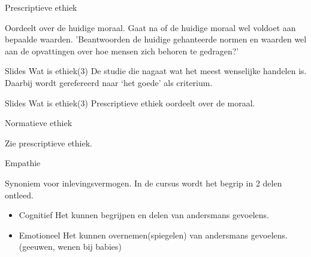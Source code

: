 \documentclass[main.tex]{subfiles}
\begin{document}
\begin{examenvraag}
    \begin{vraag}
        Prescriptieve ethiek
    \end{vraag}

    \begin{antwoord}
	    	
    	Oordeelt over de huidige moraal.
    	Gaat na of de huidige moraal wel voldoet aan bepaalde waarden. 
    	'Beantwoorden de huidige gehanteerde normen en waarden wel aan de opvattingen over hoe mensen zich behoren te gedragen?'
    		
		\begin{citaat}{Slides Wat is ethiek(3)}
				De studie die nagaat wat het meest wenselijke handelen is. 
				Daarbij wordt gerefereerd naar ‘het goede’ als criterium.
		\end{citaat}
		\begin{citaat}{Slides Wat is ethiek(3)}
				Prescriptieve ethiek oordeelt over de moraal.
		\end{citaat}
    \end{antwoord}
\end{examenvraag}


\begin{examenvraag}
    \begin{vraag}
        Normatieve ethiek
    \end{vraag}

    \begin{antwoord}
		Zie prescriptieve ethiek.
    \end{antwoord}
\end{examenvraag}


\begin{examenvraag}
    \begin{vraag}
        Empathie
    \end{vraag}

    \begin{antwoord}
		Synoniem voor inlevingsvermogen.
		In de cursus wordt het begrip in 2 delen ontleed.
		\begin{itemize}
			\item Cognitief
				Het kunnen begrijpen en delen van andersmans gevoelens.
			\item Emotioneel
				Het kunnen overnemen(spiegelen) van andersmans gevoelens. (geeuwen, wenen bij babies)
		\end{itemize}
    \end{antwoord}
\end{examenvraag}
\end{document}
